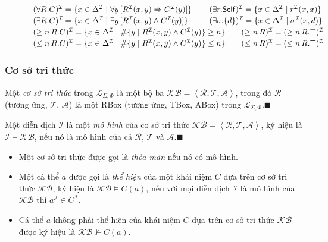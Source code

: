 \documentclass[fleqn]{beamer}
\newcommand{\mL}		{\mathcal{L}}
\newcommand{\mA}		{\mathcal{A}}
\newcommand{\mT}		{\mathcal{T}}
\newcommand{\mR}		{\mathcal{R}}
\newcommand{\mI}		{\mathcal{I}}
\newcommand{\Self}		{\mathsf{Self}}
\newcommand{\KB}		{\mathcal{KB}}
\newcommand{\mLSP}		{\mL_{\Sigma,\Phi}}
\newcommand{\myend}		{\mbox{}\hfill\mbox{{\tiny$\!\blacksquare$}}}
\newcommand{\tuple}[1]	{\left\langle#1\right\rangle\!}
\newcommand{\V}			{\forall}
\newcommand{\E}			{\exists}
\begin{document}
\begin{frame}
{\begin{figure}
{\[\begin{array}{c c c}
				\multicolumn{3}{l}{(\V R.C)^\mI = \{ x \in \Delta^\mI \mid \V y\,[R^\mI(x,y) \Rightarrow C^\mI(y)]\}\,\qquad (\E r.\Self)^\mI = \{x \in \Delta^\mI \mid r^\mI(x,x)\}} \\[0.5ex]
				\multicolumn{3}{l}{(\E R.C)^\mI = \{ x \in \Delta^\mI \mid \E y\,[R^\mI(x,y) \wedge C^\mI(y)]\}\ \; \qquad (\E \sigma.\{d\})^\mI = \{ x \in \Delta^\mI \mid \sigma^\mI(x,d)\}} \\[0.5ex]
				\multicolumn{3}{l}{(\geq n\,R.C)^\mI = \{x \in \Delta^\mI \mid \#\{y \mid R^\mI(x,y) \wedge C^\mI(y)\} \geq n\} 
					\qquad (\geq n\,R)^\mI = (\geq n\,R.\top)^\mI} \\[0.5ex]
				\multicolumn{3}{l}{(\leq n\,R.C)^\mI = \{x \in \Delta^\mI \mid \#\{y \mid R^\mI(x,y) \wedge C^\mI(y)\} \leq n \}
					\qquad(\leq n\,R)^\mI = (\leq n\,R.\top)^\mI}
				\end{array}
				\vspace{-2.5ex}
				\]}
		\end{figure}
	}
\end{frame}

\begin{frame}\frametitle{\bf Cơ sở tri thức}
	\vspace{-1.0ex}
	{\small
		\begin{definition}
			Một {\em cơ sở tri thức} trong $\mLSP$ là một bộ ba \mbox{$\KB = \tuple{\mR, \mT, \mA}$}, trong đó $\mR$ (tương ứng, $\mT$, $\mA$) là một RBox (tương ứng, TBox, ABox) trong $\mLSP$.\myend
		\end{definition}
		
		\begin{definition}[Mô hình]
			Một diễn dịch $\mI$ là một {\em mô hình} của cơ sở tri thức $\KB=\tuple{\mR,\mT, \mA}$, ký hiệu là $\mI \models \KB$, nếu nó là mô hình của cả $\mR$, $\mT$ và $\mA$.\myend
		\end{definition}
		
		\begin{itemize}
			\item Một cơ sở tri thức được gọi là {\em thỏa mãn} nếu nó có mô hình. 
			\vspace{1.0ex}
			
			\item Một cá thể $a$ được gọi là {\em thể hiện} của một khái niệm $C$ dựa trên cơ sở tri thức $\KB$, ký hiệu là $\KB \models C(a)$, nếu với mọi diễn dịch $\mI$ là mô hình của $\KB$ thì $a^\mI \in C^\mI$. 
			\vspace{1.0ex}
			
			\item Cá thể $a$ không phải thể hiện của khái niệm $C$ dựa trên cơ sở tri thức $\KB$ được ký hiệu là $\KB \not \models C(a)$.
		\end{itemize}
	}
\end{frame}
\end{document}
